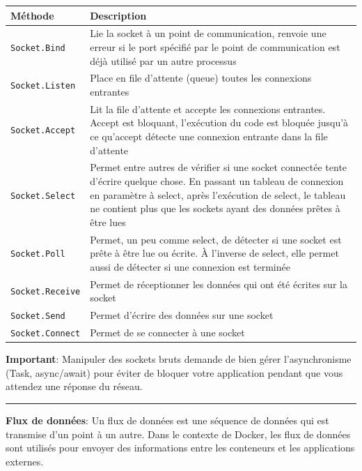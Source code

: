 \begin{center}
\begin{tabular}{|p{}|p{}|}
\hline
\textbf{Méthode} & \textbf{Description} \\ \hline
\texttt{Socket.Bind} & Lie la socket à un point de communication, renvoie une erreur si le port spécifié par le point de communication est déjà utilisé par un autre processus \\ \hline
\texttt{Socket.Listen} & Place en file d'attente (queue) toutes les connexions entrantes \\ \hline
\texttt{Socket.Accept} & Lit la file d'attente et accepte les connexions entrantes. Accept est bloquant, l'exécution du code est bloquée jusqu'à ce qu'accept détecte une connexion entrante dans la file d'attente \\ \hline
\texttt{Socket.Select} & Permet entre autres de vérifier si une socket connectée tente d'écrire quelque chose. En passant un tableau de connexion en paramètre à select, après l'exécution de select, le tableau ne contient plus que les sockets ayant des données prêtes à être lues \\ \hline
\texttt{Socket.Poll} & Permet, un peu comme select, de détecter si une socket est prête à être lue ou écrite. À l'inverse de select, elle permet aussi de détecter si une connexion est terminée \\ \hline
\texttt{Socket.Receive} & Permet de réceptionner les données qui ont été écrites sur la socket \\ \hline
\texttt{Socket.Send} & Permet d'écrire des données sur une socket \\ \hline
\texttt{Socket.Connect} & Permet de se connecter à une socket \\ \hline
\end{tabular}
\end{center}

\vspace{0.5cm}

\noindent \textbf{Important}: Manipuler des sockets bruts demande de bien gérer l'asynchronisme (Task, async/await) pour éviter de bloquer votre application pendant que vous attendez une réponse du réseau.

\begin{center}
\rule{5cm}{0.4pt}
\end{center}

\vspace{0.5cm}
\noindent \textbf{Flux de données}:
\noindent Un flux de données est une séquence de données qui est transmise d'un point à un autre. Dans le contexte de Docker, les flux de données sont utilisés pour envoyer des informations entre les conteneurs et les applications externes.

